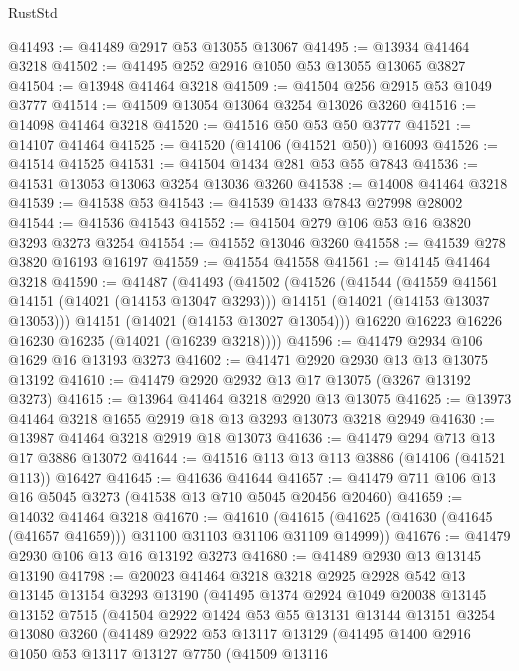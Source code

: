 \begin{lexlean}{RustStd}
\begin{coremodule}
@41493 := @41489 @2917 @53 @13055 @13067
@41495 := @13934 @41464 @3218
@41502 := @41495 @252 @2916 @1050 @53 @13055 @13065 @3827
@41504 := @13948 @41464 @3218
@41509 := @41504 @256 @2915 @53 @1049 @3777
@41514 := @41509 @13054 @13064 @3254 @13026 @3260
@41516 := @14098 @41464 @3218
@41520 := @41516 @50 @53 @50 @3777
@41521 := @14107 @41464
@41525 := @41520 (@14106 (@41521 @50)) @16093
@41526 := @41514 @41525
@41531 := @41504 @1434 @281 @53 @55 @7843
@41536 := @41531 @13053 @13063 @3254 @13036 @3260
@41538 := @14008 @41464 @3218
@41539 := @41538 @53
@41543 := @41539 @1433 @7843 @27998 @28002
@41544 := @41536 @41543
@41552 := @41504 @279 @106 @53 @16 @3820 @3293 @3273 @3254
@41554 := @41552 @13046 @3260
@41558 := @41539 @278 @3820 @16193 @16197
@41559 := @41554 @41558
@41561 := @14145 @41464 @3218
@41590 := @41487
    (@41493
      (@41502
        (@41526
          (@41544
            (@41559 @41561 @14151 (@14021 (@14153 @13047 @3293)))
            @14151
            (@14021 (@14153 @13037 @13053)))
          @14151
          (@14021 (@14153 @13027 @13054)))
        @16220
        @16223
        @16226
        @16230
        @16235
        (@14021 (@16239 @3218))))
@41596 := @41479 @2934 @106 @1629 @16 @13193 @3273
@41602 := @41471 @2920 @2930 @13 @13 @13075 @13192
@41610 := @41479 @2920 @2932 @13 @17 @13075 (@3267 @13192 @3273)
@41615 := @13964 @41464 @3218 @2920 @13 @13075
@41625 := @13973 @41464 @3218 @1655 @2919 @18 @13 @3293 @13073 @3218 @2949
@41630 := @13987 @41464 @3218 @2919 @18 @13073
@41636 := @41479 @294 @713 @13 @17 @3886 @13072
@41644 := @41516 @113 @13 @113 @3886 (@14106 (@41521 @113)) @16427
@41645 := @41636 @41644
@41657 := @41479 @711 @106 @13 @16 @5045 @3273 (@41538 @13 @710 @5045 @20456 @20460)
@41659 := @14032 @41464 @3218
@41670 := @41610
    (@41615 (@41625 (@41630 (@41645 (@41657 @41659))) @31100 @31103 @31106 @31109 @14999))
@41676 := @41479 @2930 @106 @13 @16 @13192 @3273
@41680 := @41489 @2930 @13 @13145 @13190
@41798 := @20023
    @41464
    @3218
    @3218
    @2925
    @2928
    @542
    @13
    @13145
    @13154
    @3293
    @13190
    (@41495
      @1374
      @2924
      @1049
      @20038
      @13145
      @13152
      @7515
      (@41504
        @2922
        @1424
        @53
        @55
        @13131
        @13144
        @13151
        @3254
        @13080
        @3260
        (@41489
          @2922
          @53
          @13117
          @13129
          (@41495
            @1400
            @2916
            @1050
            @53
            @13117
            @13127
            @7750
            (@41509
              @13116

\end{coremodule}
\end{lexlean}
